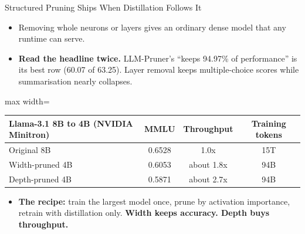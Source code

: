 \begin{frame}{Structured Pruning Ships When Distillation Follows It}
    \begin{itemize}\itemsep0.35em
        \item Removing whole neurons or layers gives an ordinary dense model that any runtime can serve.
        \item \textbf{Read the headline twice.} LLM-Pruner's ``keeps 94.97\% of performance'' is its best row (60.07 of 63.25). Layer removal keeps multiple-choice scores while summarisation nearly collapses.
    \end{itemize}
    \begin{center}
    \small
    \begin{adjustbox}{max width=\linewidth}\begin{tabular}{lccc}
        \toprule
        \textbf{Llama-3.1 8B to 4B (NVIDIA Minitron)} & \textbf{MMLU} & \textbf{Throughput} & \textbf{Training tokens} \\
        \midrule
        Original 8B & 0.6528 & 1.0x & 15T \\
        \rowcolor{KAUSTcyan!12} Width-pruned 4B & 0.6053 & about 1.8x & 94B \\
        Depth-pruned 4B & 0.5871 & about 2.7x & 94B \\
        \bottomrule
    \end{tabular}\end{adjustbox}
    \end{center}
    \begin{itemize}\itemsep0.35em
        \item \textbf{The recipe:} train the largest model once, prune by activation importance, retrain with distillation only. \textbf{Width keeps accuracy. Depth buys throughput.}
    \end{itemize}
\end{frame}

